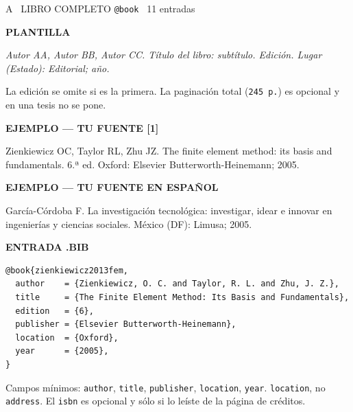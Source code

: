 \documentclass[11pt,a4paper]{article}
\newcommand{\rot}[1]{\vspace{2pt}\par{\footnotesize\bfseries\color{gris}\MakeUppercase{#1}}\par\vspace{1pt}}
\newcommand{\refv}[1]{\par{\small #1}\par}
\newcommand{\plantilla}[1]{\par{\small\itshape\color{tinta} #1}\par}
\newcommand{\anot}[1]{{\color{gris}\footnotesize #1}}
\begin{document}
\begin{ficha}{A \textperiodcentered\ LIBRO COMPLETO \hfill \normalfont\texttt{@book} \textperiodcentered\ 11 entradas}
\rot{plantilla}
\plantilla{Autor AA, Autor BB, Autor CC. Título del libro: subtítulo. Edición. Lugar
(Estado): Editorial; año.}
\anot{La edición se omite si es la primera. La paginación total (\texttt{245 p.}) es opcional
y en una tesis no se pone.}

\rot{ejemplo --- tu fuente [1]}
\refv{Zienkiewicz OC, Taylor RL, Zhu JZ. The finite element method: its basis and
fundamentals. 6.ª ed. Oxford: Elsevier Butterworth-Heinemann; 2005.}

\rot{ejemplo --- tu fuente en español}
\refv{García-Córdoba F. La investigación tecnológica: investigar, idear e innovar en
ingenierías y ciencias sociales. México (DF): Limusa; 2005.}

\rot{entrada .bib}
\begin{Verbatim}[fontsize=\small,xleftmargin=4pt]
@book{zienkiewicz2013fem,
  author    = {Zienkiewicz, O. C. and Taylor, R. L. and Zhu, J. Z.},
  title     = {The Finite Element Method: Its Basis and Fundamentals},
  edition   = {6},
  publisher = {Elsevier Butterworth-Heinemann},
  location  = {Oxford},
  year      = {2005},
}
\end{Verbatim}
\anot{Campos mínimos: \texttt{author}, \texttt{title}, \texttt{publisher}, \texttt{location},
\texttt{year}. \texttt{location}, no \texttt{address}. El \texttt{isbn} es opcional y sólo si
lo leíste de la página de créditos.}
\end{ficha}
\end{document}
